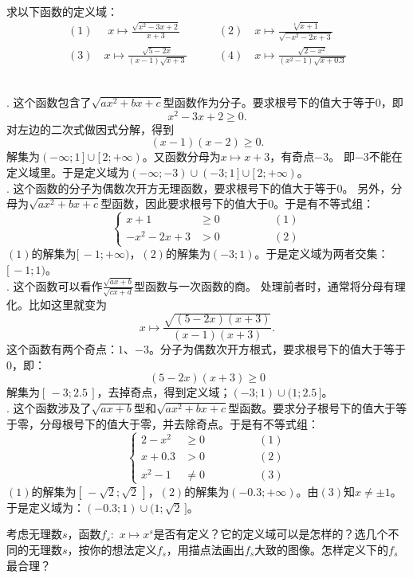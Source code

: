 \documentclass[12pt,UTF8,fontset=none]{ctexbook}
\begin{document}
\begin{et}
    求以下函数的定义域：\\
    \begin{align*}
        (1) \,\,\quad x\mapsto \frac{\sqrt{x^2 - 3x + 2}}{x + 3} \quad & \quad (2) \quad x\mapsto \frac{\sqrt[4]{x + 1}}{\sqrt{- x^2 - 2x + 3}} \\
        (3) \quad x\mapsto \frac{\sqrt{5 - 2x}}{(x - 1)\sqrt{x + 3}} \quad & \quad (4)\quad x\mapsto \frac{\sqrt{2 - x^2}}{(x^2 - 1)\sqrt{x + 0.3}}  
    \end{align*}
\end{et}
\begin{so}
    \mbox{}\\
    . 这个函数包含了$\sqrt{ax^2 + bx + c}$型函数作为分子。要求根号下的值大于等于$0$，即
    $$ x^2 - 3x + 2 \geqslant 0.$$
    对左边的二次式做因式分解，得到
    $$ (x - 1)(x - 2) \geqslant 0.$$
    解集为$(-\infty; 1\,]\cup[\,2; +\infty)$。又函数分母为$x\mapsto x + 3$，有奇点$-3$。
    即$-3$不能在定义域里。于是定义域为$(-\infty; -3)\cup(-3; 1\,]\cup[\,2;  +\infty)$。\\
    . 这个函数的分子为偶数次开方无理函数，要求根号下的值大于等于$0$。
    另外，分母为$\sqrt{ax^2 + bx + c}$型函数，因此要求根号下的值大于$0$。于是有不等式组：
    $$\left\{\begin{array}{ccr}
        x + 1 &\geqslant 0 & \quad\quad\quad\quad (1) \\
        - x^2 - 2x + 3 &> 0  & \quad\quad\quad\quad (2)
    \end{array}\right.$$
    $(1)$的解集为$[\,-1; +\infty)$，$(2)$的解集为$(-3;  1)$。于是定义域为两者交集：$[\,-1;  1)$。\\
    . 这个函数可以看作$\frac{\sqrt{ax + b}}{\sqrt{cx + d}}$型函数与一次函数的商。
    处理前者时，通常将分母有理化。比如这里就变为
    $$ x \mapsto \frac{\sqrt{(5 - 2x)(x + 3)}}{(x - 1)(x + 3)}. $$
    这个函数有两个奇点：$1$、$-3$。分子为偶数次开方根式，要求根号下的值大于等于$0$，即：
    $$ (5 - 2x)(x + 3) \geqslant 0$$
    解集为$[\,-3; 2.5\,]$，去掉奇点，得到定义域；$(-3; 1)\cup(1; 2.5\,]$。\\
    . 这个函数涉及了$\sqrt{ax + b}$型和$\sqrt{ax^2 + bx + c}$型函数。要求分子根号下的值大于等于零，分母根号下的值大于零，并去除奇点。于是有不等式组：
    $$\left\{\begin{array}{ccr}
        2 - x^2 &\geqslant 0 & \quad\quad\quad\quad (1) \\
        x + 0.3 &> 0  & \quad\quad\quad\quad (2) \\
        x^2 - 1 &\neq 0 & \quad\quad\quad\quad (3) 
    \end{array}\right.$$
    $(1)$的解集为$[\,-\sqrt{2};\sqrt{2}\,]$，$(2)$的解集为$(-0.3; +\infty)$。由$(3)$知$x\neq \pm 1$。
    于是定义域为：$(-0.3; 1)\cup(1; \sqrt{2}\,]$。
\end{so}
\begin{sk}
    考虑无理数$s$，函数$f_s: \,\, x\mapsto x^s$是否有定义？它的定义域可以是怎样的？选几个不同的无理数$s$，按你的想法定义$f_s$，用描点法画出$f_s$大致的图像。怎样定义下的$f_s$最合理？
\end{sk}
\end{document}
